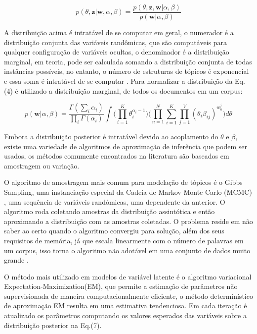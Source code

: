 \documentclass[12pt,a4paper]{article}
\begin{document}
  \begin{equation}
  p(\theta,\textbf{z}|\textbf{w},\alpha,\beta) = \frac{p(\theta,\textbf{z},\textbf{w}|\alpha,\beta)}{p(\textbf{w}|\alpha,\beta)}
  \end{equation}
  
  A distribuição acima é intratável de se computar em geral, o numerador é a distribuição conjunta das variáveis randômicas, que são computáveis para qualquer configuração de variáveis ocultas,
   o denominador é a distribuição marginal, em teoria, pode ser calculada somando a distribuição conjunta de todas instâncias possíveis, no entanto,
   o número de estruturas de tópicos é exponencial e essa soma é intratável de se computar \cite{blei2012probabilistic}. Para normalizar a distribuição da Eq.(4) é utilizado a distribuição marginal,
   de todos os documentos em um corpus:
  
  \begin{equation}
  p(\textbf{w}|\alpha,\beta)=\frac{\Gamma(\sum_{i}\alpha_i)}{\prod_{i}\Gamma(\alpha_i)}\int{\Bigg(\prod_{i=1}^{K}\theta_i^{\alpha_i-1}\Bigg)} \Bigg(\prod_{n=1}^{N}\sum_{i=1}^{K}\prod_{j=1}^{V}(\theta_i\beta_{ij})^{w_n^j}\Bigg)d\theta
  \end{equation}
  
  Embora a distribuição posterior é intratável devido ao acoplamento do $\theta$ e $\beta$, existe uma variedade de algoritmos de aproximação de inferência que podem ser usados,
   os métodos comumente encontrados na literatura são baseados em amostragem ou variação.
  
  O algoritmo de amostragem mais comum para modelação de tópicos é o Gibbs Sampling, uma instanciação especial da Cadeia de Markov Monte Carlo (MCMC) \cite{jordan1999introduction},
   uma sequência de variáveis randômicas, uma dependente da anterior. O algoritmo roda coletando amostras da distribuição assintótica e então aproximando a distribuição com as amostras coletadas.
   O problema reside em não saber ao certo  quando o algoritmo convergiu para solução, além dos seus requisitos de memória, já que escala linearmente com o número de palavras em um corpus,
   isso torna o algoritmo não adotável em uma conjunto de dados muito grande \cite{vrehuuvrek2011scalability}.
  
  O método mais utilizado em modelos de variável latente é o algoritmo variacional Expectation-Maximization(EM), que permite a estimação de parâmetros não supervisionada de maneira computacionalmente eficiente,
   o método determinístico de aproximação EM resulta em uma estimativa tendenciosa. Em cada iteração é atualizado os parâmetros computando os valores esperados das variáveis sobre a distribuição posterior na Eq.(7).
  
\end{document}
